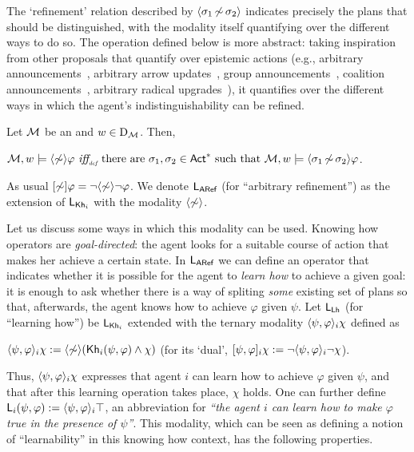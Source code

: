 The `refinement' relation described by $\langle \sigma_1{\,\not\sim\,}\sigma_2 \rangle$ indicates precisely the plans that should be distinguished, with the modality itself quantifying over the different ways to do so. The operation defined below is more abstract: taking inspiration from other proposals that quantify over epistemic actions (e.g., arbitrary announcements~\cite{BalbianiBDHHL08}, arbitrary arrow updates~\cite{DitmarschHKK17}, group announcements~\cite{GroupAJ}, coalition announcements~\cite{AgotnesD08}, arbitrary radical upgrades~\cite{FI24}), it quantifies over the different ways in which the agent's indistinguishability can be refined. 

\medskip

\begin{definition}\label{def:sem:aref}
Let $\mathcal{M}$ be an \ults and $w\in\operatorname{D}_{\mathcal{M}}$.  %
Then,
\begin{spcenter}
  $\mathcal{M},w\models\langle \not\sim \rangle\varphi\ \mbox{\it iff}_{\mbox{\tiny\it def}} \ \text{there are } \sigma_1,\sigma_2 \in {\rm \sf Act}^* \text{ such that } \mathcal{M},w \models \langle \sigma_1{\,\not\sim\,}\sigma_2 \rangle\varphi$.
\end{spcenter}
As usual $[\not\sim]\varphi = \neg\langle \not\sim \rangle\neg\varphi$. We denote $\mathsf{L_{ARef}}$ (for ``arbitrary refinement'') as the extension of $\mathsf{L}_{{\sf Kh}_i}$ with the modality $\langle \not\sim \rangle$.
\end{definition}

\medskip

Let us discuss some ways in which this modality can be used. Knowing how operators are \emph{goal-directed}: the agent looks for a suitable course of action that makes her achieve a certain state. 
In $\mathsf{L_{ARef}}$ we can define an operator that indicates whether it is possible for the agent to \emph{learn how} to achieve a given goal: it is enough to ask whether there is a way of spliting \emph{some} existing set of plans so that, afterwards, the agent knows how to achieve $\varphi$ given $\psi$. Let $\mathsf{L_{Lh}}$ (for ``learning how'') be $\mathsf{L}_{{\sf Kh}_i}$ extended with the ternary modality $\langle \psi,\varphi \rangle_i\chi$ defined as
\begin{spcenter}
$\langle \psi,\varphi \rangle_i\chi := \langle \not\sim \rangle({\sf Kh}_i(\psi,\varphi) \wedge\chi)$ \qquad (for its `dual', $[\psi,\varphi]_i\chi := \neg\langle \psi,\varphi \rangle_i\neg\chi$).
\end{spcenter}

Thus, $\langle \psi,\varphi \rangle_i\chi$ expresses that agent $i$ can learn how to achieve $\varphi$ given $\psi$, and that after this learning operation takes place, $\chi$ holds. One can further define ${\sf L}_i(\psi,\varphi) := \langle \psi,\varphi \rangle_i\top$, an abbreviation for \emph{``the agent $i$ can learn how to make $\varphi$ true in the presence of $\psi$''}. 
This modality, which can be seen as defining a notion of ``learnability'' in this knowing how context, has the following properties.

